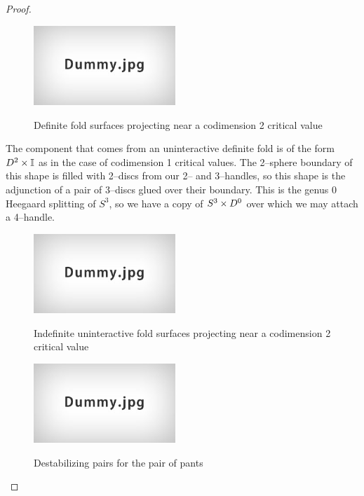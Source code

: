 \begin{proof}
	\begin{figure}
		\centering
		\captionsetup{justification=centering}
		\caption{Definite fold surfaces projecting near a codimension 2 critical value}
		\includegraphics[height=3cm]{figures/dummy.jpg}
		\label{fig:deffoldprojcodim2}
	\end{figure}

	The component that comes from an uninteractive definite fold is of the form $D^2\times\mathbb{I}$ as in the case of codimension 1 critical values.
	The 2--sphere boundary of this shape is filled with 2--discs from our 2-- and 3--handles, so this shape is the adjunction of a pair of 3--discs glued over their boundary.
	This is the genus 0 Heegaard splitting of $S^3$, so we have a copy of $S^3\times D^0$ over which we may attach a 4--handle.
	
	\begin{figure}
		\centering
		\captionsetup{justification=centering}
		\caption{Indefinite uninteractive fold surfaces projecting near a codimension 2 critical value}
		\includegraphics[height=3cm]{figures/dummy.jpg}
		\label{fig:indeffoldprojcodim2}
	\end{figure}
	
	\begin{figure}
		\centering
		\caption{Destabilizing pairs for the pair of pants}
		\includegraphics[height=3cm]{figures/dummy.jpg}
		\label{fig:destabpants}
	\end{figure}
		

\end{proof}
